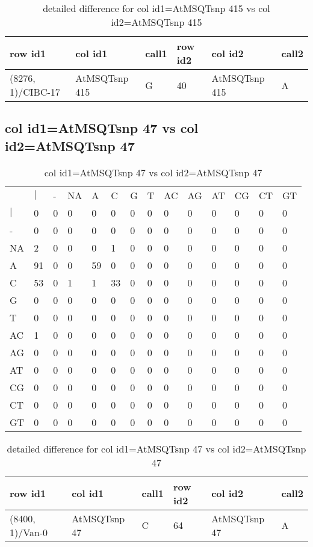 \begin{center}
\begin{longtable}{|l|l|l|l|l|l|}
\caption{detailed difference for col id1=AtMSQTsnp 415 vs col id2=AtMSQTsnp 415} \label{table_dm733}\\
\hline
row id1&col id1&call1&row id2&col id2&call2\\
\hline
(8276, 1)/CIBC-17&AtMSQTsnp 415&G&40&AtMSQTsnp 415&A\\
\hline
\end{longtable}
\end{center}

\subsection{col id1=AtMSQTsnp 47 vs col id2=AtMSQTsnp 47}
\begin{center}
\begin{longtable}{|l|l|l|l|l|l|l|l|l|l|l|l|l|l|}
\caption{col id1=AtMSQTsnp 47 vs col id2=AtMSQTsnp 47} \label{table_dm734}\\
\hline
\\
\hline
&$|$&-&NA&A&C&G&T&AC&AG&AT&CG&CT&GT\\
$|$&0&0&0&0&0&0&0&0&0&0&0&0&0\\
-&0&0&0&0&0&0&0&0&0&0&0&0&0\\
NA&2&0&0&0&1&0&0&0&0&0&0&0&0\\
A&91&0&0&59&0&0&0&0&0&0&0&0&0\\
C&53&0&1&1&33&0&0&0&0&0&0&0&0\\
G&0&0&0&0&0&0&0&0&0&0&0&0&0\\
T&0&0&0&0&0&0&0&0&0&0&0&0&0\\
AC&1&0&0&0&0&0&0&0&0&0&0&0&0\\
AG&0&0&0&0&0&0&0&0&0&0&0&0&0\\
AT&0&0&0&0&0&0&0&0&0&0&0&0&0\\
CG&0&0&0&0&0&0&0&0&0&0&0&0&0\\
CT&0&0&0&0&0&0&0&0&0&0&0&0&0\\
GT&0&0&0&0&0&0&0&0&0&0&0&0&0\\
\hline
\end{longtable}
\end{center}

\begin{center}
\begin{longtable}{|l|l|l|l|l|l|}
\caption{detailed difference for col id1=AtMSQTsnp 47 vs col id2=AtMSQTsnp 47} \label{table_dm735}\\
\hline
row id1&col id1&call1&row id2&col id2&call2\\
\hline
(8400, 1)/Van-0&AtMSQTsnp 47&C&64&AtMSQTsnp 47&A\\
\hline
\end{longtable}
\end{center}

